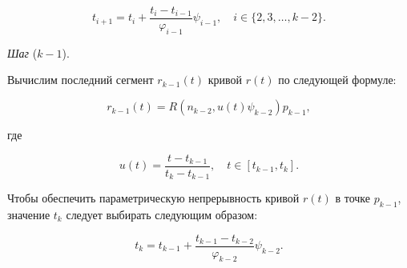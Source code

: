 $$
t_{i+1}=t_i+\frac{t_i-t_{i-1}}{\varphi_{i-1}}\psi_{i-1}, \quad i \in \{2,3,\dots,k-2\}.
$$

\bigskip
\textit{Шаг} ($k-1$).

Вычислим последний сегмент $r_{k-1}(t)$ кривой $r(t)$ по следующей формуле:

$$
r_{k-1}(t)=R(n_{k-2},u(t)\psi_{k-2})p_{k-1},
$$

\noindent где

$$
u(t)=\frac{t-t_{k-1}}{t_k-t_{k-1}}, \quad t \in [t_{k-1},t_k].
$$

Чтобы обеспечить параметрическую непрерывность кривой $r(t)$ в точке $p_{k-1}$, значение $t_k$ следует выбирать
следующим образом:

$$
t_k=t_{k-1}+\frac{t_{k-1}-t_{k-2}}{\varphi_{k-2}}\psi_{k-2}.
$$
